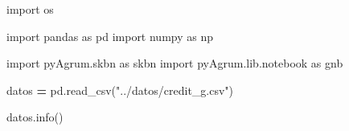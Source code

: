 \documentclass[
  a4paper,
  DIV=11,
  numbers=noendperiod]{scrreprt}
\newenvironment{Shaded}{\begin{snugshade}}{\end{snugshade}}
\newcommand{\ImportTok}[1]{#1}
\newcommand{\NormalTok}[1]{#1}
\newcommand{\OperatorTok}[1]{\textcolor[rgb]{0.81,0.36,0.00}{\textbf{#1}}}
\newcommand{\StringTok}[1]{\textcolor[rgb]{0.31,0.60,0.02}{#1}}
\begin{document}
\begin{Shaded}
\begin{Highlighting}[numbers=left,,]
\ImportTok{import}\NormalTok{ os}

\ImportTok{import}\NormalTok{ pandas }\ImportTok{as}\NormalTok{ pd}
\ImportTok{import}\NormalTok{ numpy }\ImportTok{as}\NormalTok{ np}

\ImportTok{import}\NormalTok{ pyAgrum.skbn }\ImportTok{as}\NormalTok{ skbn}
\ImportTok{import}\NormalTok{ pyAgrum.lib.notebook }\ImportTok{as}\NormalTok{ gnb}

\NormalTok{datos }\OperatorTok{=}\NormalTok{ pd.read\_csv(}\StringTok{"../datos/credit\_g.csv"}\NormalTok{)}

\NormalTok{datos.info()}
\end{Highlighting}
\end{Shaded}
\end{document}
